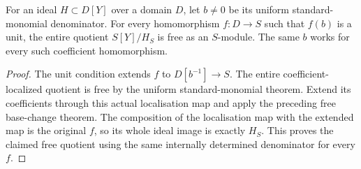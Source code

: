 \begin{theorem}
\label{hir:relative-normal-coefficient-uniform-denominator-free-images}
\leanok
{}
For an ideal $H\subset D[Y]$ over a domain $D$, let $b\ne0$ be its
uniform standard-monomial denominator. For every homomorphism $f:D\to S$
such that $f(b)$ is a unit, the entire quotient $S[Y]/H_S$ is free as an
$S$-module. The same $b$ works for every such coefficient homomorphism.
\end{theorem}
\begin{proof}
The unit condition extends $f$ to $D[b^{-1}]\to S$. The entire
coefficient-localized quotient is free by the uniform standard-monomial
theorem. Extend its coefficients through this actual localisation map and
apply the preceding free base-change theorem. The composition of the
localisation map with the extended map is the original $f$, so its whole
ideal image is exactly $H_S$. This proves the claimed free quotient using
the same internally determined denominator for every $f$.
\end{proof}
